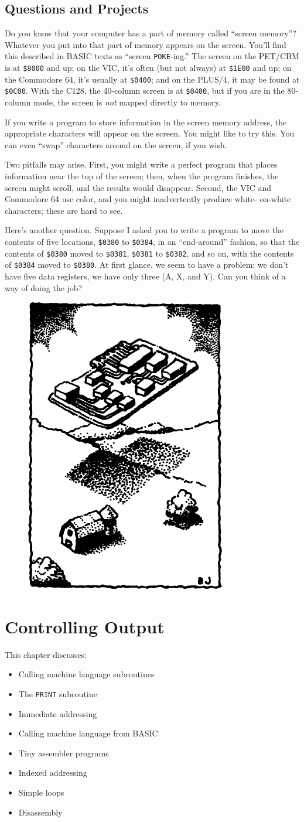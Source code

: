 \documentclass[11pt,a4paper,titlepage]{memoir}
\def\chapterpicture{
	\pagestyle{plain}
\newpage

\begin{figure}
	\centering
	\includegraphics[width=1\linewidth]{screenshot002}
	\label{fig:screenshot002}
\end{figure}
\newpage
}
\begin{document}
\section{Questions and Projects}
Do you know that your computer has a part of memory called ``screen
memory''? Whatever you put into that part of memory appears on the
screen. You'll find this described in BASIC texts as ``screen \texttt{POKE}-ing.''
The screen on the PET/CBM is at \texttt{\$8000} and up; on the VIC, it's often
(but not always) at \texttt{\$1E00} and up; on the Commodore 64, it's usually at
\texttt{\$0400}; and on the PLUS/4, it may be found at \texttt{\$0C00}. With the C128,
the 40-column screen is at \texttt{\$0400}, but if you are in the 80-column mode,
the screen is \emph{not} mapped directly to memory.

If you write a program to store information in the screen memory address,
the appropriate characters will appear on the screen. You might like to try
this. You can even ``swap'' characters around on the screen, if you wish.

Two pitfalls may arise. First, you might write a perfect program that places
information near the top of the screen; then, when the program finishes,
the screen might scroll, and the results would disappear. Second, the VIC
and Commodore 64 use color, and you might inadvertently produce white-
on-white characters; these are hard to see.

Here's another question. Suppose I asked you to write a program to move
the contents of five locations, \texttt{\$0380} to \texttt{\$0384}, in an ``end-around''
fashion, so that the contents of \texttt{\$0380} moved to \texttt{\$0381}, \texttt{\$0381} to
\texttt{\$0382}, and so on, with the contents of \texttt{\$0384} moved to \texttt{\$0380}. At
first glance, we seem to have a problem: we don't have five data registers,
we have only three (A, X, and Y). Can you think of a way of doing the
job?

\chapterpicture

\chapter{Controlling Output}
This chapter discusses:
\begin{itemize}
	\item Calling machine language subroutines
	\item The \texttt{PRINT} subroutine
	\item Immediate addressing
	\item Calling machine language from BASIC
	\item Tiny assembler programs
	\item Indexed addressing
	\item Simple loops
	\item Disassembly
\end{itemize}
\newpage
\pagestyle{myfancy}
\end{document}
